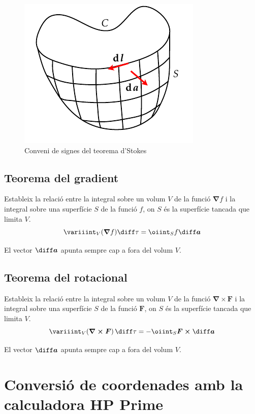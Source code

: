 \documentclass[catalan,a4paper,twoside,11pt]{article}
\begin{document}
\begin{figure}[h]
\centering
     \includegraphics{Imatges/Stokes.pdf}
\caption{Conveni de signes del teorema d'Stokes}
\label{pic:signe-teo-stockes}
\end{figure}


\subsection{Teorema del gradient}
Estableix la relació entre la integral sobre un volum $V$ de la funció $\boldsymbol{\nabla}f$ i la integral sobre una superfície $S$ de la funció $f$, on $S$ és la superfície tancada que limita $V$.
\begin{equation}
    \variiint_V(\boldsymbol{\nabla}f)\diff \tau = \oiint_S f\boldsymbol{\diff a}
\end{equation}

El vector $\boldsymbol{\diff a}$ apunta sempre cap a fora del volum $V$.

\subsection{Teorema del rotacional}
Estableix la relació entre la integral sobre un volum $V$ de la funció $\boldsymbol{\nabla\times F}$ i la integral sobre una superfície $S$ de la funció $\boldsymbol{F}$, on $S$ és la superfície tancada que limita $V$.
\begin{equation}
    \variiint_V(\boldsymbol{\nabla\times F})\,\diff \tau=-\oiint_S
    \boldsymbol{F\times\diff a}
\end{equation}

El vector $\boldsymbol{\diff a}$ apunta sempre cap a fora del volum $V$.

\section{Conversió de coordenades amb la calculadora HP Prime}
\end{document}
